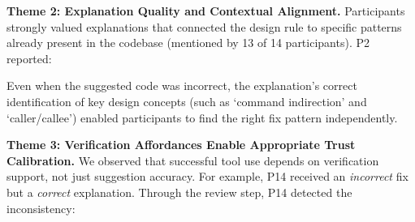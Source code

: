 





\textbf{Theme 2: Explanation Quality and Contextual Alignment.} Participants strongly valued explanations that connected the design rule to specific patterns already present in the codebase (mentioned by 13 of 14 participants). %
P2 reported: 




Even when the suggested code was incorrect, the explanation's correct identification of key design concepts (such as `command indirection' and `caller/callee') enabled participants to find the right fix pattern independently. 


\textbf{Theme 3: Verification Affordances Enable Appropriate Trust Calibration.} We observed that successful tool use depends on verification support, not just suggestion accuracy. For example, P14 received an \textit{incorrect} fix 
but a \textit{correct} explanation. Through the review step, P14 detected the inconsistency:

